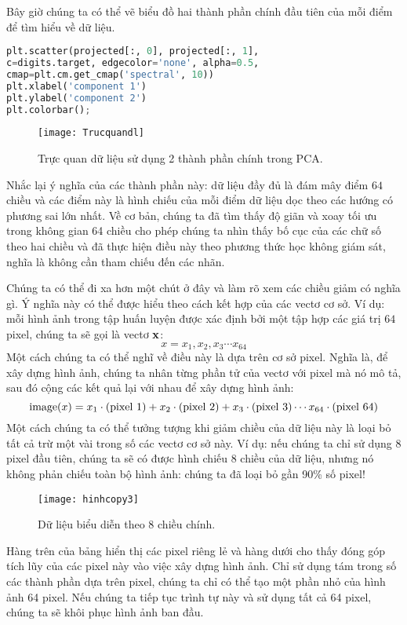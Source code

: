 Bây giờ chúng ta có thể vẽ biểu đồ hai thành phần chính đầu tiên của mỗi điểm để tìm hiểu về dữ liệu.
\begin{lstlisting}[language=Python]
plt.scatter(projected[:, 0], projected[:, 1],
c=digits.target, edgecolor='none', alpha=0.5,
cmap=plt.cm.get_cmap('spectral', 10))
plt.xlabel('component 1')
plt.ylabel('component 2')
plt.colorbar();
\end{lstlisting}
\begin{figure}[htb]
	\centering
	\texttt{[image: Trucquandl]}
	\caption{Trực quan dữ liệu sử dụng 2 thành phần chính trong PCA.}
	\label{fig:trucquandl}
\end{figure}
Nhắc lại ý nghĩa của các thành phần này: dữ liệu đầy đủ là đám mây điểm $64$ chiều và các điểm này là hình chiếu của mỗi điểm dữ liệu dọc theo các hướng có phương sai lớn nhất. Về cơ bản, chúng ta đã tìm thấy độ giãn và xoay tối ưu trong không gian 64 chiều cho phép chúng ta nhìn thấy bố cục của các chữ số theo hai chiều và đã thực hiện điều này theo phương thức học không giám sát, nghĩa là không cần tham chiếu đến các nhãn.

Chúng ta có thể đi xa hơn một chút ở đây và làm rõ xem các chiều giảm có nghĩa gì. Ý nghĩa này có thể được hiểu theo cách kết hợp của các vectơ cơ sở. Ví dụ: mỗi hình ảnh trong tập huấn luyện được xác định bởi một tập hợp các giá trị $64$ pixel, chúng ta sẽ gọi là vectơ $\bf{x}$:
$$x = x_1, x_2, x_3 \cdots x_{64}$$
Một cách chúng ta có thể nghĩ về điều này là dựa trên cơ sở pixel. Nghĩa là, để xây dựng hình ảnh, chúng ta nhân từng phần tử của vectơ với pixel mà nó mô tả, sau đó cộng các kết quả lại với nhau để xây dựng hình ảnh:
$${\rm image}(x) = x_1 \cdot{\rm (pixel~1)} + x_2 \cdot{\rm (pixel~2)} + x_3 \cdot{\rm (pixel~3)} \cdots x_{64} \cdot{\rm (pixel~64)}$$
Một cách chúng ta có thể tưởng tượng khi giảm chiều của dữ liệu này là loại bỏ tất cả trừ một vài trong số các vectơ cơ sở này. Ví dụ: nếu chúng ta chỉ sử dụng $8$ pixel đầu tiên, chúng ta sẽ có được hình chiếu $8$ chiều của dữ liệu, nhưng nó không phản chiếu toàn bộ hình ảnh: chúng ta đã loại bỏ gần 90\% số pixel!
\begin{figure}[htb]
	\centering
	\texttt{[image: hinhcopy3]}
	\caption{Dữ liệu biểu diễn theo 8 chiều chính.}
	\label{fig:hinhcopy3}
\end{figure}
Hàng trên của bảng hiển thị các pixel riêng lẻ và hàng dưới cho thấy đóng góp tích lũy của các pixel này vào việc xây dựng hình ảnh. Chỉ sử dụng tám trong số các thành phần dựa trên pixel, chúng ta chỉ có thể tạo một phần nhỏ của hình ảnh 64 pixel. Nếu chúng ta tiếp tục trình tự này và sử dụng tất cả 64 pixel, chúng ta sẽ khôi phục hình ảnh ban đầu.

